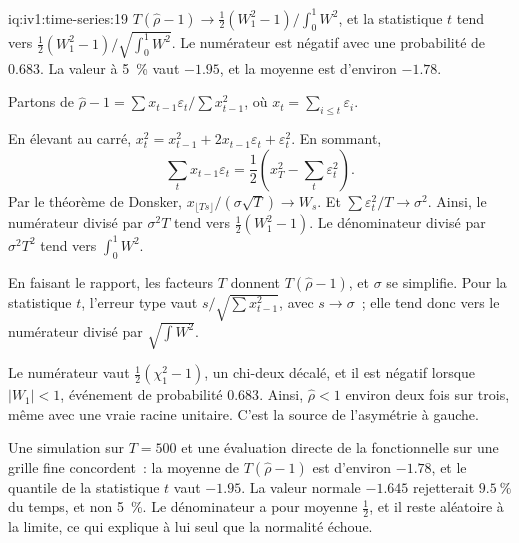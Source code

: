 \begin{solution}{iq:iv1:time-series:19}
$T(\hat{\rho} - 1) \to \frac12(W_1^2 - 1)/\int_0^1W^2$, et la statistique $t$ tend vers $\frac12(W_1^2 - 1)/\sqrt{\int_0^1W^2}$. Le numérateur est négatif avec une probabilité de $0.683$. La valeur à 5~\% vaut $-1.95$, et la moyenne est d'environ $-1.78$.

Partons de $\hat{\rho} - 1 = \sum x_{t - 1}\varepsilon_t/\sum x_{t - 1}^2$, où $x_t = \sum_{i \le t}\varepsilon_i$.

En élevant au carré, $x_t^2 = x_{t - 1}^2 + 2x_{t - 1}\varepsilon_t + \varepsilon_t^2$. En sommant,
\[
\sum_tx_{t - 1}\varepsilon_t = \frac12\left(x_T^2 - \sum_t\varepsilon_t^2\right).
\]
Par le théorème de Donsker, $x_{\lfloor Ts\rfloor}/(\sigma\sqrt{T}) \to W_s$. Et $\sum\varepsilon_t^2/T \to \sigma^2$. Ainsi, le numérateur divisé par $\sigma^2T$ tend vers $\frac12(W_1^2 - 1)$. Le dénominateur divisé par $\sigma^2T^2$ tend vers $\int_0^1W^2$.

En faisant le rapport, les facteurs $T$ donnent $T(\hat{\rho} - 1)$, et $\sigma$ se simplifie. Pour la statistique $t$, l'erreur type vaut $s/\sqrt{\sum x_{t - 1}^2}$, avec $s \to \sigma$~; elle tend donc vers le numérateur divisé par $\sqrt{\int W^2}$.

Le numérateur vaut $\frac12(\chi_1^2 - 1)$, un chi-deux décalé, et il est négatif lorsque $|W_1| < 1$, événement de probabilité $0.683$. Ainsi, $\hat{\rho} < 1$ environ deux fois sur trois, même avec une vraie racine unitaire. C'est la source de l'asymétrie à gauche.

Une simulation sur $T = 500$ et une évaluation directe de la fonctionnelle sur une grille fine concordent~: la moyenne de $T(\hat{\rho} - 1)$ est d'environ $-1.78$, et le quantile de la statistique $t$ vaut $-1.95$. La valeur normale $-1.645$ rejetterait $9.5~\%$ du temps, et non 5~\%. Le dénominateur a pour moyenne $\frac12$, et il reste aléatoire à la limite, ce qui explique à lui seul que la normalité échoue.



\end{solution}

